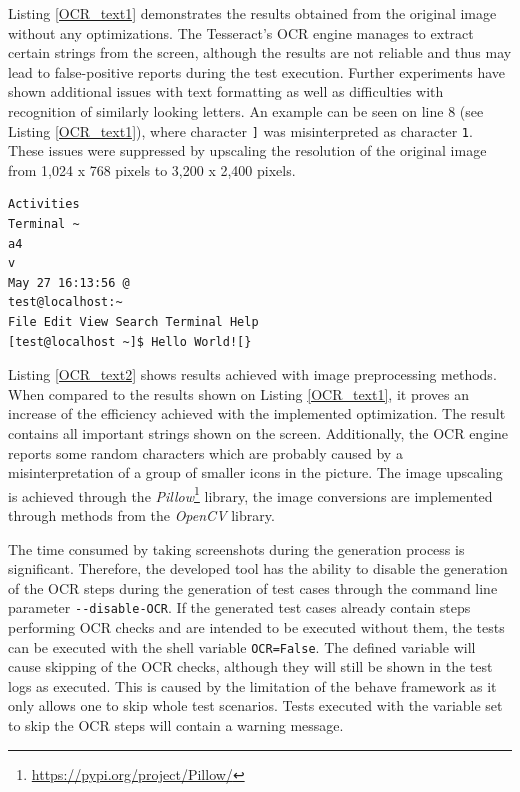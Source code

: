 Listing \ref{OCR_text1} demonstrates the results obtained from the original image without any optimizations. The Tesseract's OCR engine manages to extract certain strings from the screen, although the results are not reliable and thus may lead to false-positive reports during the test execution. Further experiments have shown additional issues with text formatting as well as difficulties with recognition of similarly looking letters. An example can be seen on line 8 (see Listing \ref{OCR_text1}), where character \texttt{]} was misinterpreted as character \texttt{1}. These issues were suppressed by upscaling the resolution of the original image from 1,024 x 768 pixels to 3,200 x 2,400 pixels.

\begin{lstlisting}[caption={Text extracted from Figure \ref{ocr_conversion} with all implemented optimizations},label={OCR_text2}]
Activities
Terminal ~
a4
v
May 27 16:13:56 @
test@localhost:~
File Edit View Search Terminal Help
[test@localhost ~]$ Hello World![}
\end{lstlisting}

Listing \ref{OCR_text2} shows results achieved with image preprocessing methods. When compared to the results shown on Listing \ref{OCR_text1}, it proves an increase of the efficiency achieved with the implemented optimization. The result contains all important strings shown on the screen. Additionally, the OCR engine reports some random characters which are probably caused by a misinterpretation of a group of smaller icons in the picture. The image upscaling is achieved through the \textit{Pillow}\footnote{\url{https://pypi.org/project/Pillow/}} library, the image conversions are implemented through methods from the \textit{OpenCV} library. 

The time consumed by taking screenshots during the generation process is significant. Therefore, the developed tool has the ability to disable the generation of the OCR steps during the generation of test cases through the command line parameter \texttt{-{}-disable-OCR}. If the generated test cases already contain steps performing OCR checks and are intended to be executed without them, the tests can be executed with the shell variable \texttt{OCR=False}. The defined variable will cause skipping of the OCR checks, although they will still be shown in the test logs as executed. This is caused by the limitation of the behave framework as it only allows one to skip whole test scenarios. Tests executed with the variable set to skip the OCR steps will contain a warning message.

